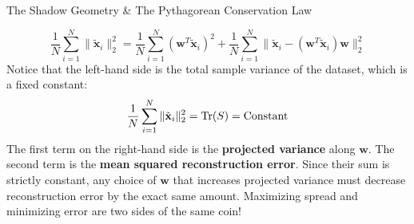 \begin{ponderbox}{The Shadow Geometry \& The Pythagorean Conservation Law}
\begin{enumerate}
    \begin{equation*}
    \frac{1}{N}\sum_{i=1}^N \|\tilde{\mathbf{x}}_i\|_2^2 = \frac{1}{N}\sum_{i=1}^N (\mathbf{w}^T \tilde{\mathbf{x}}_i)^2 + \frac{1}{N}\sum_{i=1}^N \|\tilde{\mathbf{x}}_i - (\mathbf{w}^T \tilde{\mathbf{x}}_i)\mathbf{w}\|_2^2
    \end{equation*}
    Notice that the left-hand side is the total sample variance of the dataset, which is a fixed constant:
    \begin{equation*}
    \frac{1}{N}\sum_{i=1}^N \|\tilde{\mathbf{x}}_i\|_2^2 = \operatorname{Tr}(S) = \text{Constant}
    \end{equation*}
    The first term on the right-hand side is the \textbf{projected variance} along $\mathbf{w}$. The second term is the \textbf{mean squared reconstruction error}. Since their sum is strictly constant, any choice of $\mathbf{w}$ that increases projected variance must decrease reconstruction error by the exact same amount. Maximizing spread and minimizing error are two sides of the same coin!
\end{enumerate}
\end{ponderbox}

